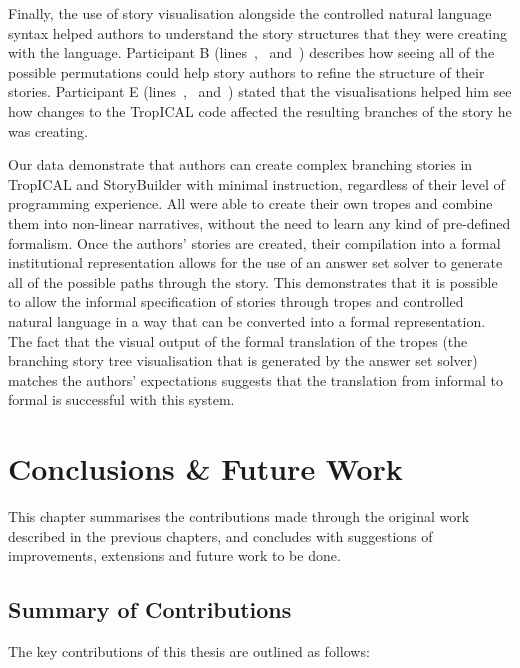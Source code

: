 \documentclass[11pt]{report}
\begin{document}
Finally, the use of story visualisation alongside the controlled natural
language syntax helped authors to understand the story structures that they were
creating with the language. Participant B
(lines~,~ and~) describes
how seeing all of the possible permutations could help story authors to refine
the structure of their stories. Participant E
(lines~,~ and~)
stated that the visualisations helped him see how changes to the TropICAL code
affected the resulting branches of the story he was creating.

Our data demonstrate that authors can create complex branching stories in
TropICAL and StoryBuilder with minimal instruction, regardless of their level of
programming experience. All were able to create their own tropes and combine
them into non-linear narratives, without the need to learn any kind of
pre-defined formalism. Once the authors' stories are created, their compilation
into a formal institutional representation allows for the use of an answer set
solver to generate all of the possible paths through the story. This
demonstrates that it is possible to allow the informal specification of stories
through tropes and controlled natural language in a way that can be converted
into a formal representation. The fact that the visual output of the formal translation
of the tropes (the branching story tree visualisation that is generated by the
answer set solver) matches the authors' expectations suggests that the
translation from informal to formal is successful with this system.

\chapter{Conclusions \& Future Work}
\label{cha:conclusions}

This chapter summarises the contributions made through the original work described
in the previous chapters, and concludes with suggestions of improvements,
extensions and future work to be done.

\section{Summary of Contributions}

The key contributions of this thesis are outlined as follows:
\end{document}
